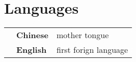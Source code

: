 \section*{Languages}

\begin{tabular}{p{} p{} p{}}
 & \textbf{Chinese} & mother tongue\\
 & \textbf{English} & first forign language\\  
\end{tabular}
